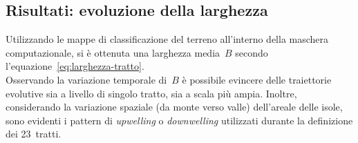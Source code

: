 \subsection{Risultati: evoluzione della larghezza}
Utilizzando le mappe di classificazione del terreno all'interno della maschera computazionale, si è ottenuta una larghezza media~$B$ secondo l'equazione~\eqref{eq:larghezza-tratto}.
\\
Osservando la variazione temporale di~$B$ è possibile evincere delle traiettorie evolutive sia a livello di singolo tratto, sia a scala più ampia.
Inoltre, considerando la variazione spaziale (da monte verso valle) dell'areale delle isole, sono evidenti i pattern di \emph{upwelling} o \emph{downwelling} utilizzati durante la definizione dei 23~tratti.






